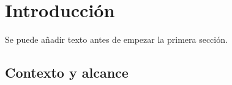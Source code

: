 \documentclass[12pt,twoside,titlepage]{report}
\newcommand\blankpage{%
    \newpage
    \null
    \thispagestyle{empty}%
    \newpage}
\begin{document}
\lstlistoflistings
\afterpage{\blankpage}









\pagestyle{fancy}


\renewcommand{\chaptermark}[1]{\markboth{Capítulo \thechapter.\ #1}{}}

\pagestyle{fancy}
\fancyhf{}
\fancyhead[LO]{\leftmark}
\fancyhead[RO]{}
\fancyhead[RE]{\nouppercase\rightmark}
\fancyhead[LE]{}
\fancyfoot[C]{\thepage}










\chapter{Introducción}



\pagestyle{fancy}


\setlength{\parskip}{0.75em}
\renewcommand{\baselinestretch}{1.25}
\setcounter{page}{1}




Se puede añadir texto antes de empezar la primera sección.


\section{Contexto y alcance}
\end{document}
